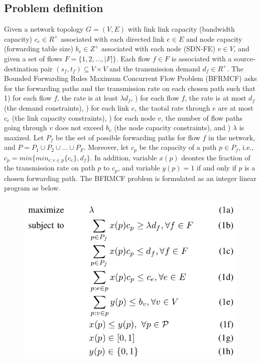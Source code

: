 \documentclass[a4paper,12pt]{report}
\begin{document}
\begin{CJK*}{UTF8}{bkai}
\begin{large}
    \subsection{Problem definition}
    \qquad Given a network topology $G=(V, E)$ with link link capacity (bandwidth capacity) $c_e\in R^+$ associated with each directed link $e\in E$ and node capacity (forwarding table size) $b_v\in Z^+$ associated with each node (SDN-FE) $v\in V$, and given a set of flows $F=\{ 1, 2, ..., |F|\}$. Each flow $f\in F$ is associated with a source-destination pair $ \left( s_f,t_f \right)\subseteq V \times V $ and the transmission demand $d_f \in R^+$. The Bounded Forwarding Rules Maximum Concurrent Flow Problem (BFRMCF) asks for the forwarding paths and the transmission rate on each chosen path such that 1) for each flow $f$, the rate is at least $\lambda d_f$, ) for each flow $f$, the rate is at most $d_f$ (the demand constraints), ) for each link $e$, the taotal rate through $e$ are at most $c_e$ (the link capacity constraints), ) for each node $v$, the number of flow paths going through $v$ does not exceed $b_v$ (the node capacity constraints), and ) $\lambda$ is maxized. \newline\null
\qquad Let $P_f$ be the set of possible forwarding paths for flow $f$ in the network, and $P=P_1 \cup P_2 \cup ... \cup P_F$. Moreover, let $c_p$ be the capacity of a path $p \in P_f$, i.e., $c_p = min\{ min_{e:e\in p} \{ c_e \}, d_f\}$. In addition, variable $x\left( p \right)$ deontes the fraction of the transmission rate on path $p$ to $c_p$, and variable $y\left( p \right) = 1$ if and only if $p$ is a chosen forwarding path. The BFRMCF problem is formulated as an integer linear program as below.
			\begin{figure}
	          \centering
	            \includegraphics[width=1.0\textwidth]{it_program.png}
	      	\end{figure}

\end{large}
\end{CJK*}
\end{document}
